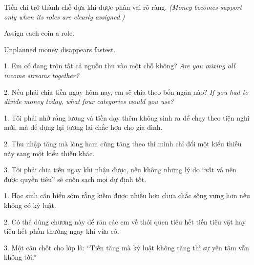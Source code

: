 \begin{baihoc}
Tiền chỉ trở thành chỗ dựa khi được phân vai rõ ràng.
\textit{(Money becomes support only when its roles are clearly assigned.)}
\end{baihoc}

\begin{ghinhoanh}
Assign each coin a role.

Unplanned money disappears fastest.
\end{ghinhoanh}

\begin{tuhocnhanh}
1. Em có đang trộn tất cả nguồn thu vào một chỗ không? \textit{Are you mixing all income streams together?}

2. Nếu phải chia tiền ngay hôm nay, em sẽ chia theo bốn ngăn nào? \textit{If you had to divide money today, what four categories would you use?}
\end{tuhocnhanh}

\begin{turanminh}
1. Tôi phải nhớ rằng lương và tiền dạy thêm không sinh ra để chạy theo tiện nghi mới, mà để dựng lại tương lai chắc hơn cho gia đình.

2. Thu nhập tăng mà lòng ham cũng tăng theo thì mình chỉ đổi một kiểu thiếu này sang một kiểu thiếu khác.

3. Tôi phải chia tiền ngay khi nhận được, nếu không những lý do ``vất vả nên được quyền tiêu'' sẽ cuốn sạch mọi dự định tốt.
\end{turanminh}

\begin{dayhoc}
1. Học sinh cần hiểu sớm rằng kiếm được nhiều hơn chưa chắc sống vững hơn nếu không có kỷ luật.

2. Có thể dùng chương này để răn các em về thói quen tiêu hết tiền tiêu vặt hay tiêu hết phần thưởng ngay khi vừa có.

3. Một câu chốt cho lớp là: ``Tiền tăng mà kỷ luật không tăng thì sự yên tâm vẫn không tới.''
\end{dayhoc}
